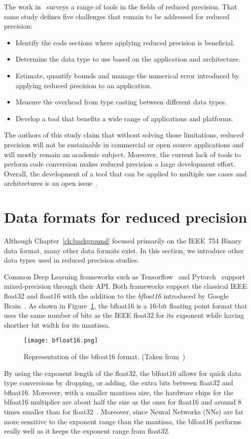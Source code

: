 The work in~\cite{Cherubin2020-tt} surveys a range of tools in the fields of reduced precision.
That same study defines five challenges that remain to be addressed for reduced precision:
\begin{itemize}
	\item[1.] Identify the code sections where applying reduced precision is beneficial.
	\item[2.] Determine the data type to use based on the application and architecture.
	\item[3.] Estimate, quantify bounds and manage the numerical error introduced by applying reduced precision to an application.
	\item[4.] Measure the overhead from type casting between different data types.
	\item[5.] Develop a tool that benefits a wide range of applications and platforms.
\end{itemize}
The authors of this study claim that without solving those limitations, reduced 
precision will not be sustainable in commercial or open source applications and 
will mostly remain an academic subject.
Moreover, the current lack of tools to perform code conversion makes reduced precision
a large development effort.
Overall, the development of a tool that can be applied to multiple use cases and
architectures is an open issue~\cite{Cherubin2020-tt}.

\section{Data formats for reduced precision}
\label{sc:rp-data-format}
Although Chapter~\ref{ch:background} focused primarily on the IEEE~754 Binary data format, many other data formats exist.
In this section, we introduce other data types used in reduced precision studies.

Common Deep Learning frameworks such as Tensorflow~\cite{tensorflow2015-whitepaper} and Pytorch~\cite{PyTorch_2019} support mixed-precision through their API.
Both frameworks support the classical IEEE float32 and float16 with the addition to the \textit{bfloat16} introduced by Google Brain~\cite{bfloat16}.
As shown in Figure~\ref{fig:bfloat16}, the bfloat16 is a 16-bit floating point format that uses
the same number of bits as the IEEE float32 for its exponent while having shorther bit width for its mantissa.
\begin{figure}[b]
	\centering
	\texttt{[image: bfloat16.png]}
	\caption{Representation of the bfloat16 format. (Taken from~\cite{bfloat16})}
	\label{fig:bfloat16}
\end{figure}
By using the exponent length of the float32, the blfoat16 allows for quick
data type conversions by dropping, or adding, the extra bits between float32 and bfloat16.
Moreover, with a smaller mantissa size, the hardware chips for the blfoat16 multiplier
are about half the size as the ones for float16 and around 8 times smaller than for float32~\cite{bfloat16}.
Moreover, since Neural Networks (NNs) are far more sensitive to the exponent range than the mantissa,
the blfoat16 performs really well as it keeps the exponent range from float32.

